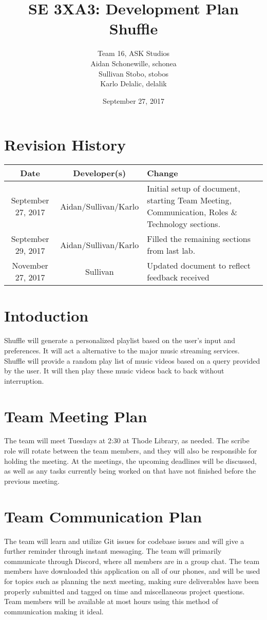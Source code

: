 \documentclass{article}
\title{SE 3XA3: Development Plan\\Shuffle}
\author{Team 16, ASK Studios
        \\ Aidan Schonewille, schonea
        \\ Sullivan Stobo, stobos
        \\ Karlo Delalic, delalik
}
\date{September 27, 2017}
\begin{document}
\section*{Revision History}
\begin{center}
\begin{tabular}{| c | c | p{6cm} |}
\hline
\textbf{Date} & \textbf{Developer(s)} & \textbf{Change}\\
\hline
September 27, 2017 & Aidan/Sullivan/Karlo & Initial setup of document, starting Team Meeting, Communication, Roles \& Technology sections.\\
\hline
September 29, 2017 & Aidan/Sullivan/Karlo & Filled the remaining sections from last lab.\\
\hline
November 27, 2017 & Sullivan & Updated document to reflect feedback received \\
\hline
\end{tabular}
\end{center}

\newpage

\maketitle

\newpage

\section*{Intoduction}
Shuffle will generate a personalized playlist based on the user's input and preferences. It will act a alternative to the major music streaming services. Shuffle will provide a random play list of music videos based on a query provided by the user.  It will then play these music videos back to back without interruption.

\section{Team Meeting Plan}
The team will meet Tuesdays at 2:30 at Thode Library, as needed. The scribe role will rotate between the team members, and they will also be responsible for holding the meeting. At the meetings, the upcoming deadlines will be discussed, as well as any tasks currently being worked on that have not finished before the previous meeting.

\section{Team Communication Plan}
The team will learn and utilize Git issues for codebase issues and will give a further reminder through instant messaging. The team will primarily communicate through Discord, where all members are in a group chat. The team members have downloaded this application on all of our phones, and will be used for topics such as planning the next meeting, making sure deliverables have been properly submitted and tagged on time and miscellaneous project questions.  Team members will be available at most hours using this method of communication making it ideal.
\end{document}
